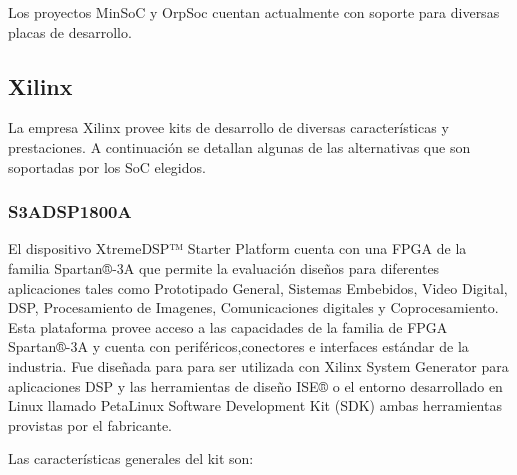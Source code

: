 				Los proyectos MinSoC y OrpSoc cuentan actualmente con soporte para diversas placas de desarrollo. 

				\subsection{Xilinx}
				La empresa Xilinx provee kits de desarrollo de diversas características y prestaciones. A continuación se detallan algunas de las alternativas que
				son soportadas por los SoC elegidos.
				\subsubsection{S3ADSP1800A}
				El dispositivo XtremeDSP™ Starter Platform cuenta con una FPGA de la familia Spartan®-3A que permite la evaluación diseños para diferentes
				aplicaciones tales como Prototipado General, Sistemas Embebidos, Video Digital, DSP, Procesamiento de Imagenes, Comunicaciones digitales y
				Coprocesamiento. Esta plataforma provee acceso a las capacidades de la familia de FPGA Spartan®-3A y cuenta con periféricos,conectores e
				interfaces estándar de la industria. Fue diseñada para para ser utilizada con Xilinx System Generator para aplicaciones DSP y las herramientas de
				diseño ISE® o el entorno desarrollado en Linux llamado PetaLinux Software Development Kit (SDK) ambas herramientas provistas por el fabricante. 
				
				Las características generales del kit son:
			
